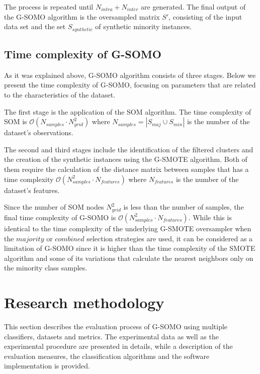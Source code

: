 \documentclass[parskip=full]{scrartcl}
\begin{document}
The process is repeated until $N_{intra} + N_{inter}$ are generated. The final output of the G-SOMO algorithm is the oversampled matrix $S'$, consisting of the input data set and the set $S_{synthetic}$ of synthetic minority instances.

\subsection{Time complexity of G-SOMO}

As it was explained above, G-SOMO algorithm consists of three stages. Below we present the time complexity of G-SOMO, focusing on parameters that are related to the characteristics of the dataset. 

The first stage is the application of the SOM algorithm.  The time complexity of SOM is \( \mathcal{O}(N_{samples} \cdot N_{grid}^2 ) \) where \( N_{samples} = |S_{maj} \cup S_{min}| \) is the number of the dataset's observations. 

The second and third stages include the identification of the filtered clusters and the creation of the synthetic instances using the G-SMOTE algorithm. Both of them require the calculation of the distance matrix between samples that has a time complexity \( \mathcal{O}(N_{samples}^2 \cdot N_{features}) \) where \( N_{features} \) is the number of the dataset's features.

Since the number of SOM nodes \( N_{grid}^2 \) is less than the number of samples, the final time complexity of G-SOMO is \( \mathcal{O}(N_{samples}^2 \cdot N_{features}) \). While this is identical to the time complexity of the underlying G-SMOTE oversampler when the $ majority $ or $ combined $ selection strategies are used, it can be considered as a limitation of G-SOMO since it is higher than the time complexity of the SMOTE algorithm and some of its variations that calculate the nearest neighbors only on the minority class samples.

\section{Research methodology}

This section describes the evaluation process of G-SOMO using multiple classifiers, datasets and metrics. The experimental data as well as the experimental procedure are presented in details, while a description of the evaluation measures, the classification algorithms and the software implementation is provided.
\end{document}
